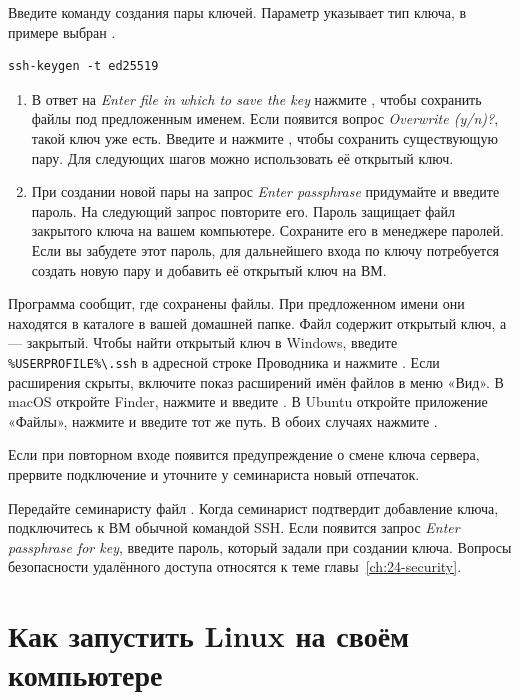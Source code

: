Введите команду создания пары ключей. Параметр  указывает тип
ключа, в примере выбран .
\begin{verbatim}
ssh-keygen -t ed25519
\end{verbatim}
\begin{enumerate}
  \item В ответ на \emph{Enter file in which to save the key}
    нажмите , чтобы сохранить файлы под предложенным именем.
    Если появится вопрос \emph{Overwrite (y/n)?}, такой ключ уже есть.
    Введите  и нажмите , чтобы сохранить существующую
    пару. Для следующих шагов можно использовать её открытый ключ.
  \item При создании новой пары на запрос \emph{Enter passphrase}
    придумайте и введите пароль. На следующий запрос повторите
    его. Пароль защищает файл закрытого ключа на вашем компьютере.
    Сохраните его в менеджере паролей. Если вы забудете этот пароль,
    для дальнейшего входа по ключу потребуется создать новую
    пару и добавить её открытый ключ на ВМ.
\end{enumerate}

Программа сообщит, где сохранены файлы. При предложенном имени они
находятся в каталоге  в вашей домашней папке.
Файл  содержит открытый ключ, а
 --- закрытый.  Чтобы найти открытый ключ в Windows,
введите \verb|%USERPROFILE%\.ssh| в адресной строке Проводника и нажмите
. Если расширения скрыты, включите показ расширений имён файлов
в меню «Вид». В macOS откройте Finder, нажмите 
и введите . В Ubuntu откройте приложение «Файлы», нажмите
 и введите тот же путь. В обоих случаях нажмите .

Если при повторном входе появится предупреждение о смене ключа сервера,
прервите подключение и уточните у семинариста новый отпечаток.

Передайте семинаристу файл . Когда семинарист
подтвердит добавление ключа, подключитесь к ВМ обычной командой SSH.
Если появится запрос \emph{Enter passphrase for key}, введите пароль,
который задали при создании ключа. Вопросы безопасности удалённого
доступа относятся к теме главы~\ref{ch:24-security}.

\section{Как запустить Linux на своём компьютере}
\label{sec:local-linux}

